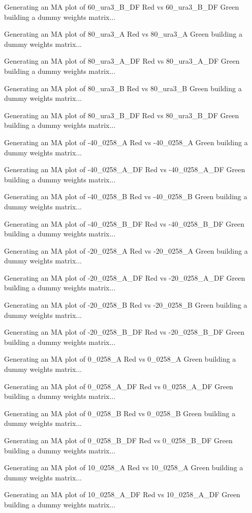 \documentclass[titlepage]{article}
\begin{document}
\begin{Schunk}
\begin{Soutput}
Generating an MA plot of  60_ura3_B_DF Red vs 60_ura3_B_DF Green 
building a dummy weights matrix... 

Generating an MA plot of  80_ura3_A Red vs 80_ura3_A Green 
building a dummy weights matrix... 

Generating an MA plot of  80_ura3_A_DF Red vs 80_ura3_A_DF Green 
building a dummy weights matrix... 

Generating an MA plot of  80_ura3_B Red vs 80_ura3_B Green 
building a dummy weights matrix... 

Generating an MA plot of  80_ura3_B_DF Red vs 80_ura3_B_DF Green 
building a dummy weights matrix... 

Generating an MA plot of  -40_0258_A Red vs -40_0258_A Green 
building a dummy weights matrix... 

Generating an MA plot of  -40_0258_A_DF Red vs -40_0258_A_DF Green 
building a dummy weights matrix... 

Generating an MA plot of  -40_0258_B Red vs -40_0258_B Green 
building a dummy weights matrix... 

Generating an MA plot of  -40_0258_B_DF Red vs -40_0258_B_DF Green 
building a dummy weights matrix... 

Generating an MA plot of  -20_0258_A Red vs -20_0258_A Green 
building a dummy weights matrix... 

Generating an MA plot of  -20_0258_A_DF Red vs -20_0258_A_DF Green 
building a dummy weights matrix... 

Generating an MA plot of  -20_0258_B Red vs -20_0258_B Green 
building a dummy weights matrix... 

Generating an MA plot of  -20_0258_B_DF Red vs -20_0258_B_DF Green 
building a dummy weights matrix... 

Generating an MA plot of  0_0258_A Red vs 0_0258_A Green 
building a dummy weights matrix... 

Generating an MA plot of  0_0258_A_DF Red vs 0_0258_A_DF Green 
building a dummy weights matrix... 

Generating an MA plot of  0_0258_B Red vs 0_0258_B Green 
building a dummy weights matrix... 

Generating an MA plot of  0_0258_B_DF Red vs 0_0258_B_DF Green 
building a dummy weights matrix... 

Generating an MA plot of  10_0258_A Red vs 10_0258_A Green 
building a dummy weights matrix... 

Generating an MA plot of  10_0258_A_DF Red vs 10_0258_A_DF Green 
building a dummy weights matrix... 


\end{Soutput}
\end{Schunk}
\end{document}
